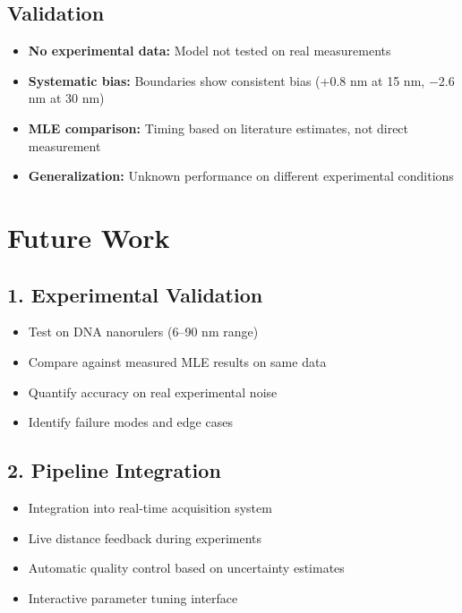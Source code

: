 \documentclass[a4paper,11pt]{article}
\begin{document}
\subsection{Validation}

\begin{itemize}[leftmargin=*]
    \item \textbf{No experimental data:} Model not tested on real measurements
    \item \textbf{Systematic bias:} Boundaries show consistent bias (+0.8 nm at 15 nm, $-$2.6 nm at 30 nm)
    \item \textbf{MLE comparison:} Timing based on literature estimates, not direct measurement
    \item \textbf{Generalization:} Unknown performance on different experimental conditions
\end{itemize}

\section{Future Work}

\subsection{1. Experimental Validation}

\begin{itemize}[leftmargin=*]
    \item Test on DNA nanorulers (6--90 nm range)
    \item Compare against measured MLE results on same data
    \item Quantify accuracy on real experimental noise
    \item Identify failure modes and edge cases
\end{itemize}

\subsection{2. Pipeline Integration}

\begin{itemize}[leftmargin=*]
    \item Integration into real-time acquisition system
    \item Live distance feedback during experiments
    \item Automatic quality control based on uncertainty estimates
    \item Interactive parameter tuning interface
\end{itemize}
\end{document}
